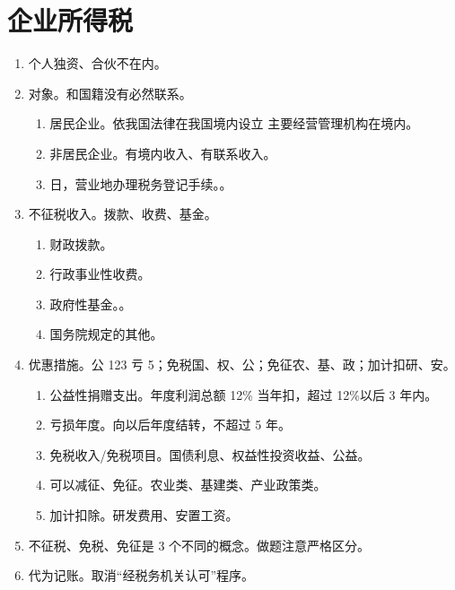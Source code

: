 \section{企业所得税}
\begin{enumerate}
  \item 个人独资、合伙不在内。
  \item 对象。和国籍没有必然联系。
        \begin{enumerate}
          \item 居民企业。依我国法律在我国境内设立 \hz 主要经营管理机构在境内。
          \item 非居民企业。有境内收入、有联系收入。
          \item {} 日，营业地办理税务登记手续。。
        \end{enumerate}
  \item 不征税收入。拨款、收费、基金。
        \begin{enumerate}
          \item 财政拨款。
          \item 行政事业性收费。
          \item 政府性基金。。
          \item 国务院规定的其他。
        \end{enumerate}
  \item 优惠措施。公 123 亏 5；免税国、权、公；免征农、基、政；加计扣研、安。
        \begin{enumerate}
          \item 公益性捐赠支出。年度利润总额 12\% 当年扣，超过 12\%以后 3 年内。
          \item 亏损年度。向以后年度结转，不超过 5 年。
          \item 免税收入/免税项目。国债利息、权益性投资收益、公益。
          \item 可以减征、免征。农业类、基建类、产业政策类。
          \item 加计扣除。研发费用、安置工资。
        \end{enumerate}
  \item 不征税、免税、免征是 3 个不同的概念。做题注意严格区分。
  \item 代为记账。取消“经税务机关认可”程序。
\end{enumerate}
